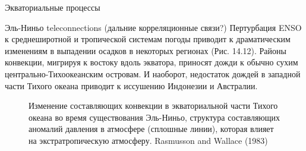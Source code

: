 \begin{chapter}{Экваториальные процессы}
\begin{section}{Эль-Ниньо teleconnections (дальние корреляционные связи?)}
Пертурбация ENSO к среднеширотной и тропической системам погоды
приводит к драматическим изменениям в выпадении осадков в некоторых
регионах (Рис. 14.12). Районы конвекции, мигрируя к востоку вдоль
экватора, приносят дожди к обычно сухим центрально-Тихоокеанским
островам. И наоборот, недостаток дождей в западной части Тихого океана
приводит к иссушению Индонезии и Австралии.
%

\begin{figure}[h!]
\caption{Изменение составляющих конвекции в экваториальной части
Тихого океана во время существования Эль-Ниньо, структура составляющих
аномалий давления в атмосфере (сплошные линии), которая влияет на
экстратропическую атмосферу. Rasmusson and Wallace (1983)}
\label{fig:pressureanomaly}
\end{figure}
%


\end{section}
\end{chapter}
